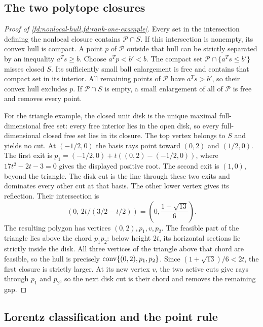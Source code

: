 \subsection{The two polytope closures}

\begin{proof}[Proof of \cref{fd:nonlocal-hull,fd:rank-one-example}]
\label{fd:polytope-proof}
Every set in the intersection defining the nonlocal closure contains
$\mathcal P\cap S$. If this intersection is nonempty, its convex hull
is compact. A point $p$ of $\mathcal P$ outside that hull can be
strictly separated by an inequality $a^Ts\ge b$. Choose
$a^Tp<b'<b$. The compact set
$\mathcal P\cap\{a^Ts\le b'\}$ misses closed $S$.
Its sufficiently small ball enlargement is free and contains that
compact set in its interior. All remaining points of $\mathcal P$
have $a^Ts>b'$, so their convex hull excludes $p$.
If $\mathcal P\cap S$ is empty, a small enlargement of all of
$\mathcal P$ is free and removes every point.

For the triangle example, the closed unit disk is the unique maximal
full-dimensional free set: every free interior lies in the open disk,
so every full-dimensional closed free set lies in its closure.
The top vertex belongs to $S$ and yields no cut. At $(-1/2,0)$ the
basis rays point toward $(0,2)$ and $(1/2,0)$. The first exit is
$p_1=(-1/2,0)+t((0,2)-(-1/2,0))$, where
$17t^2-2t-3=0$ gives the displayed positive root.
The second exit is $(1,0)$, beyond the triangle. The disk cut is
the line through these two exits and dominates every other cut
at that basis. The other lower vertex gives its reflection.
Their intersection is
\[
 (0,\,2t/(3/2-t/2))
 =\left(0,\frac{1+\sqrt{13}}6\right).
\]
The resulting polygon has vertices $(0,2),p_1,v,p_2$.
The feasible part of the triangle lies above the chord $p_1p_2$:
below height $2t$, its horizontal sections lie strictly inside the
disk. All three vertices of the triangle above that chord are
feasible, so the hull is precisely
$\operatorname{conv}\{(0,2),p_1,p_2\}$.
Since $(1+\sqrt{13})/6<2t$, the first closure is strictly larger.
At its new vertex $v$, the two active cuts give rays through
$p_1$ and $p_2$, so the next disk cut is their chord and removes
the remaining gap.
\end{proof}

\subsection{Lorentz classification and the point rule}

